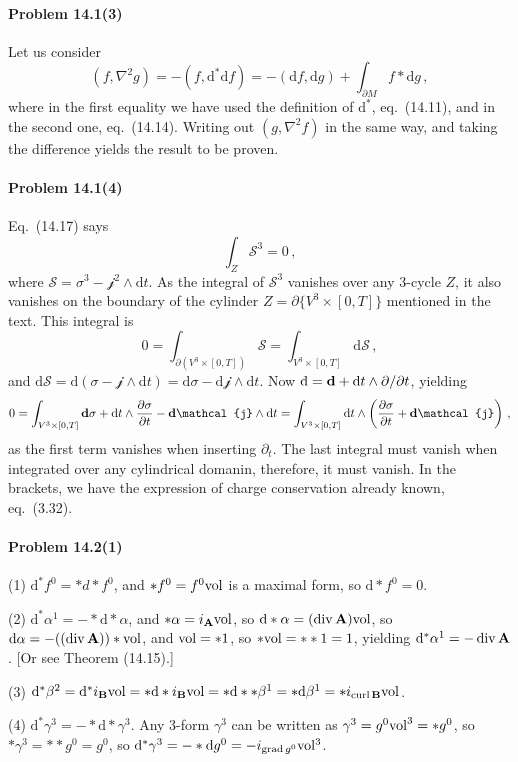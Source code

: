 \documentclass[a4paper,12pt]{article}
\def\d{\mathrm{d}}
\newcommand{\problem}[1]{\paragraph{Problem #1}}
\begin{document}

\problem{14.1(3)} Let us consider
\[
 (f,\nabla^2 g) = -(f, \d^* \d f) = -(\d f, \d g) +\int_{\partial M} f *\d g\,,
\]
where in the first equality we have used the definition of $\d^*$, eq.\ (14.11), and in the second one, eq.\ (14.14). Writing out $(g, \nabla^2 f)$ in the same  way, and taking the difference yields the result to be proven.


\problem{14.1(4)} Eq.\ (14.17) says
\[
 \int_{Z} \mathcal{S}^3 = 0\,,
\]
where $\mathcal{S} = \sigma^3 -\mathcal{j}^2\wedge \d t$. As the integral of $\mathcal{S}^3$ vanishes over any 3-cycle $Z$, it also vanishes on the boundary of the cylinder $Z=\partial\{ V^3\times [0, T]\}$ mentioned in the text. This integral is
\[
 0=\int_{\partial (V^3\times [0, T])} \mathcal{S} = \int_{V^3\times [0, T]}\d \mathcal{S}\,,
\]
and $\d\mathcal S = \d(\sigma-\mathcal{j}\wedge \d t) = \d\sigma -\d \mathcal{j}\wedge \d t$. Now $\d = {\bf d} + \d t\wedge \partial/\partial t$, yielding
\[
 0 = \int_{V^3\times[0,T]} {\bf d}\sigma + \d t \wedge \frac{\partial\sigma}{\partial t} - {\bf d}\mathcal{j}\wedge \d t = \int_{V^3\times [0, T]}\d t\wedge \left(\frac{\partial \sigma}{\partial t} + {\bf d}\mathcal{j}\right)\,,
\]
as the first term vanishes when inserting $\partial_t$. The last integral must vanish when integrated over any cylindrical domanin, therefore, it must vanish. In the brackets, we have the expression of charge conservation already known, eq.\ (3.32).


\problem{14.2(1)} (1) $\d^* f^0 =  * d *f^0$, and $*f^0 = f^0 {\rm vol}$ is a maximal form, so $\d *f^0 = 0$.

(2) $\d^* \alpha^1 = - * \d *\alpha$, and $*\alpha = i_{\bf A}{\rm vol}$, so $\d*\alpha = (\mathop{\rm div} {\bf A}){\rm vol}$, so $\*\d\*\alpha = - ((\mathop{\rm div} {\bf A}))*{\rm vol}$, and ${\rm vol} = *1$, so $*{\rm vol} = **1=1$, yielding $\d^*\alpha^1 = -\mathop{\rm div}{\bf A}$. [Or see Theorem (14.15).]

(3) $\d^* \beta^2 = \d^* i_{\bf B}{\rm vol} = *\d * i_{\bf B}{\rm vol} = *\d* *\beta^1 = *\d \beta^1 = * i_{\mathop{\rm curl}{\bf B}}{\rm vol}$.

(4) $\d^* \gamma^3 = -*\d* \gamma^3$. Any 3-form $\gamma^3$ can be written as $\gamma^3=g^0 {\rm vol}^3 = *g^0$, so $*\gamma^3 = **g^0 = g^0$, so $\d^* \gamma^3 = -*\d g^0 = -i_{\mathop{\rm grad}g^0}{\rm vol^3}$.
\end{document}
